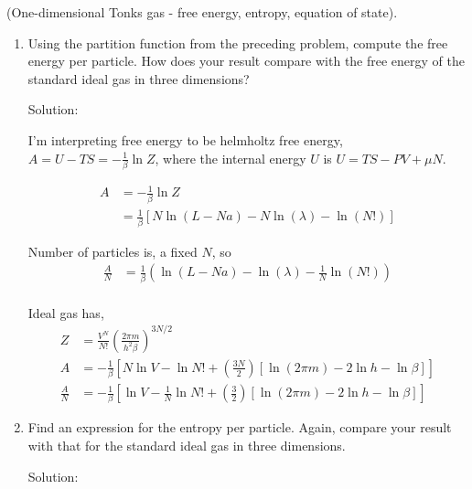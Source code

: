 \newpage
\begin{homeworkProblem}
    (One-dimensional Tonks gas - free energy, entropy, equation of state).

    \begin{enumerate}
        \item[(a)] Using the partition function from the preceding problem, compute the free energy per particle. How does your result compare with the free energy of the standard ideal gas in three dimensions?
            \begin{callout}{Solution:}

            I'm interpreting free energy to be helmholtz free energy, $A=U-TS=-\frac{1}{\beta}\ln Z$, where the internal energy $U$ is $U=TS-PV+\mu N$.

            \begin{align*}
                A &= -\frac{1}{\beta} \ln Z \\ 
                  &= \frac{1}{\beta}[N\ln (L-Na)-N\ln (\lambda)-\ln \left(N!\right)]
            \end{align*}

            Number of particles is, a fixed $N$, so 
            \begin{align*}
                \frac{A}{N} &= \frac{1}{\beta}\left( \ln \left(L-Na\right)-\ln \left(\lambda\right)- \frac{1}{N}\ln \left(N!\right) \right)\\
            \end{align*}

            Ideal gas has, 
            \begin{align*}
                Z &= \frac{V^N}{N!}\left(\frac{2 \pi m}{h^2 \beta}\right)^{3N / 2}\\ 
                A &= -\frac{1}{\beta} \left[N\ln V - \ln N! + \left( \frac{3N}{2} \right) [\ln (2\pi m) - 2 \ln h - \ln \beta] \right]\\
                \frac{A}{N} &= -\frac{1}{\beta} \left[\ln V - \frac{1}{N}\ln N! + \left( \frac{3}{2} \right) [\ln (2\pi m) - 2 \ln h - \ln \beta] \right]
            \end{align*}

            \end{callout}

        \item[(b)] Find an expression for the entropy per particle. Again, compare your result with that for the standard ideal gas in three dimensions.
            \begin{callout}{Solution:}


\end{callout}
\end{enumerate}
\end{homeworkProblem}

